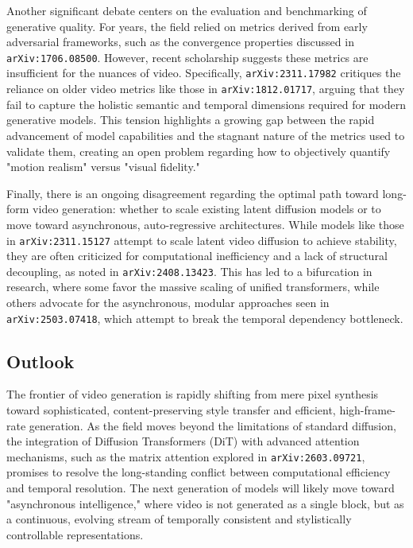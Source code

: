 \documentclass[11pt]{article}
\begin{document}
Another significant debate centers on the evaluation and benchmarking of generative quality. For years, the field relied on metrics derived from early adversarial frameworks, such as the convergence properties discussed in \texttt{arXiv:1706.08500}. However, recent scholarship suggests these metrics are insufficient for the nuances of video. Specifically, \texttt{arXiv:2311.17982} critiques the reliance on older video metrics like those in \texttt{arXiv:1812.01717}, arguing that they fail to capture the holistic semantic and temporal dimensions required for modern generative models. This tension highlights a growing gap between the rapid advancement of model capabilities and the stagnant nature of the metrics used to validate them, creating an open problem regarding how to objectively quantify "motion realism" versus "visual fidelity."

Finally, there is an ongoing disagreement regarding the optimal path toward long-form video generation: whether to scale existing latent diffusion models or to move toward asynchronous, auto-regressive architectures. While models like those in \texttt{arXiv:2311.15127} attempt to scale latent video diffusion to achieve stability, they are often criticized for computational inefficiency and a lack of structural decoupling, as noted in \texttt{arXiv:2408.13423}. This has led to a bifurcation in research, where some favor the massive scaling of unified transformers, while others advocate for the asynchronous, modular approaches seen in \texttt{arXiv:2503.07418}, which attempt to break the temporal dependency bottleneck.

\subsection{Outlook}

The frontier of video generation is rapidly shifting from mere pixel synthesis toward sophisticated, content-preserving style transfer and efficient, high-frame-rate generation. As the field moves beyond the limitations of standard diffusion, the integration of Diffusion Transformers (DiT) with advanced attention mechanisms, such as the matrix attention explored in \texttt{arXiv:2603.09721}, promises to resolve the long-standing conflict between computational efficiency and temporal resolution. The next generation of models will likely move toward "asynchronous intelligence," where video is not generated as a single block, but as a continuous, evolving stream of temporally consistent and stylistically controllable representations.
\end{document}
